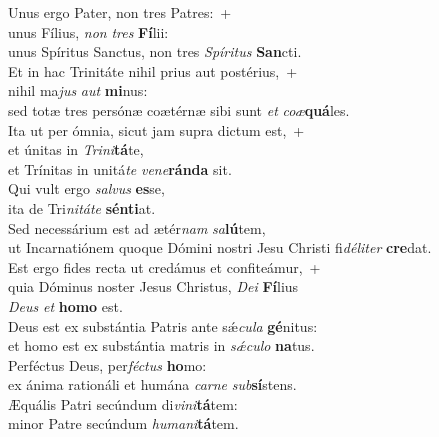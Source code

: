 \oddverse Unus ergo Pater, non tres Patres:~+\\
\oddverse  unus Fílius, \textit{non} \textit{tres} \textbf{Fí}lii:~\*\\
\oddverse unus Spíritus Sanctus, non tres \textit{Spí}\textit{ri}\textit{tus} \textbf{San}cti.\\
\evenverse Et in hac Trinitáte nihil prius aut postérius,~+\\
\evenverse  nihil ma\textit{jus} \textit{aut} \textbf{mi}nus:~\*\\
\evenverse sed totæ tres persónæ coætérnæ sibi sunt \textit{et} \textit{co}\textit{æ}\textbf{quá}les.\\
\oddverse Ita ut per ómnia, sicut jam supra dictum est,~+\\
\oddverse  et únitas in \textit{Tri}\textit{ni}\textbf{tá}te,~\*\\
\oddverse et Trínitas in unitá\textit{te} \textit{ve}\textit{ne}\textbf{rán}\textbf{da} sit.\\
\evenverse Qui vult ergo \textit{sal}\textit{vus} \textbf{es}se,~\*\\
\evenverse ita de Tri\textit{ni}\textit{tá}\textit{te} \textbf{sén}\textbf{ti}at.\\
\oddverse Sed necessárium est ad ætér\textit{nam} \textit{sa}\textbf{lú}tem,~\*\\
\oddverse ut Incarnatiónem quoque Dómini nostri Jesu Christi fi\textit{dé}\textit{li}\textit{ter} \textbf{cre}dat.\\
\evenverse Est ergo fides recta ut credámus et confiteámur,~+\\
\evenverse  quia Dóminus noster Jesus Christus, \textit{De}\textit{i} \textbf{Fí}lius~\*\\
\evenverse \textit{De}\textit{us} \textit{et} \textbf{ho}\textbf{mo} est.\\
\oddverse Deus est ex substántia Patris ante sǽ\textit{cu}\textit{la} \textbf{gé}nitus:~\*\\
\oddverse et homo est ex substántia matris in \textit{sǽ}\textit{cu}\textit{lo} \textbf{na}tus.\\
\evenverse Perféctus Deus, per\textit{fé}\textit{ctus} \textbf{ho}mo:~\*\\
\evenverse ex ánima rationáli et humána \textit{car}\textit{ne} \textit{sub}\textbf{sí}stens.\\
\oddverse Æquális Patri secúndum di\textit{vi}\textit{ni}\textbf{tá}tem:~\*\\
\oddverse minor Patre secúndum \textit{hu}\textit{ma}\textit{ni}\textbf{tá}tem.\\
